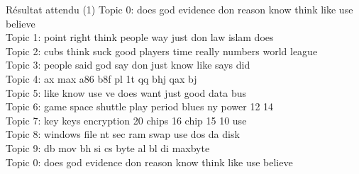 \documentclass[11pt]{beamer}
\begin{document}
\begin{frame}{Résultat attendu (1)}
Topic 0: does god evidence don reason know think like use believe\\

Topic 1: point right think people way just don law islam does\\

Topic 2: cubs think suck good players time really numbers world league\\

Topic 3: people said god say don just know like says did\\

Topic 4: ax max a86 b8f pl 1t qq bhj qax bj\\

Topic 5: like know use ve does want just good data bus\\

Topic 6: game space shuttle play period blues ny power 12 14\\

Topic 7: key keys encryption 20 chips 16 chip 15 10 use\\

Topic 8: windows file nt sec ram swap use dos da disk\\

Topic 9: db mov bh si cs byte al bl di maxbyte\\

Topic 0: does god evidence don reason know think like use believe

\end{frame}
\end{document}
